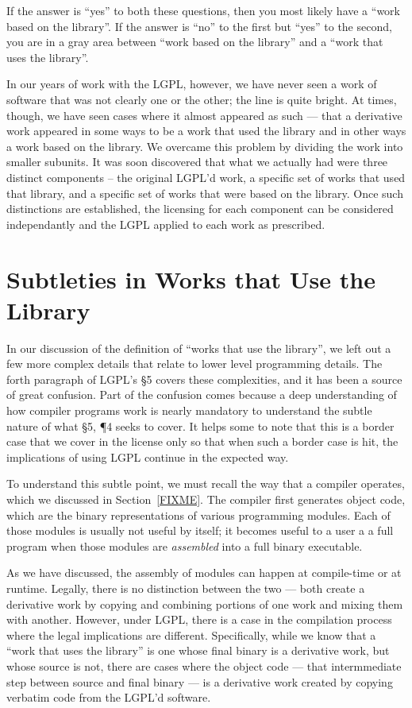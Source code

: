 \documentclass[12pt]{report}
\begin{document}
If the answer is ``yes'' to both these questions, then you most likely
have a ``work based on the library''.  If the answer is ``no'' to the
first but ``yes'' to the second, you are in a gray area between ``work
based on the library'' and a ``work that uses the library''.

In our years of work with the LGPL, however, we have never seen a work of
software that was not clearly one or the other; the line is quite bright.
At times, though, we have seen cases where it almost appeared as such ---
that a derivative work appeared in some ways to be a work that used the
library and in other ways a work based on the library.  We overcame this
problem by dividing the work into smaller subunits.  It was soon
discovered that what we actually had were three distinct components -- the
original LGPL'd work, a specific set of works that used that library, and
a specific set of works that were based on the library.  Once such
distinctions are established, the licensing for each component can be
considered independantly and the LGPL applied to each work as prescribed.


\section{Subtleties in Works that Use the Library}

In our discussion of the definition of ``works that use the library'', we
left out a few more complex details that relate to lower level programming
details.  The forth paragraph of LGPL's \S 5 covers these complexities,
and it has been a source of great confusion.  Part of the confusion comes
because a deep understanding of how compiler programs work is nearly
mandatory to understand the subtle nature of what \S 5, \P 4 seeks to
cover.  It helps some to note that this is a border case that we cover in
the license only so that when such a border case is hit, the implications
of using LGPL continue in the expected way.

To understand this subtle point, we must recall the way that a compiler
operates, which we discussed in Section~\ref{FIXME}.  The compiler first
generates object code, which are the binary representations of various
programming modules.  Each of those modules is usually not useful by
itself; it becomes useful to a user a a full program when those modules
are {\em assembled\/} into a full binary executable.

As we have discussed, the assembly of modules can happen at compile-time
or at runtime.  Legally, there is no distinction between the two --- both
create a derivative work by copying and combining portions of one work and
mixing them with another.  However, under LGPL, there is a case in the
compilation process where the legal implications are different.
Specifically, while we know that a ``work that uses the library'' is one
whose final binary is a derivative work, but whose source is not, there
are cases where the object code --- that intermmediate step between source
and final binary --- is a derivative work created by copying verbatim code
from the LGPL'd software.
\end{document}
